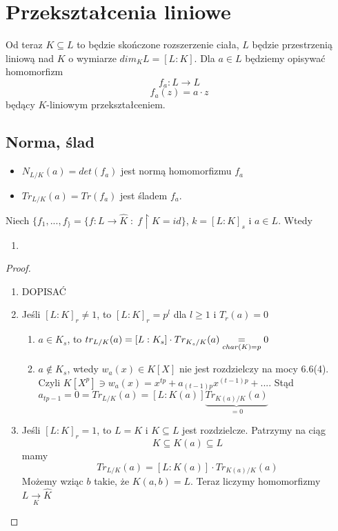 \section{Przekształcenia liniowe}

Od teraz $K\subseteq L$ to będzie skończone rozszerzenie ciała, $L$ będzie przestrzenią liniową nad $K$ o wymiarze $dim_KL=[L:K]$. Dla $a\in L$ będziemy opisywać homomorfizm
$$f_a:L\to L$$
$$f_a(z)=a\cdot z$$
będący $K$-liniowym przekształceniem.

\subsection{Norma, ślad}

\begin{bbox}
\begin{itemize}
    \item[\PHtunny] $N_{L/K}(a)=det(f_a)$ jest normą homomorfizmu $f_a$
    \item[\PHtunny] $Tr_{L/K}(a)=Tr(f_a)$ jest śladem $f_a$.
\end{itemize}
\end{bbox}

\begin{fact}
Niech $\{f_1,...,f_\}=\{f:L\to \hat{K}\;:\;f\restriction K=id\}$, $k=[L:K]_s$ i $a\in L$. Wtedy
\begin{enumerate}
    \item 
\end{enumerate}
\end{fact}
\begin{proof}
\begin{enumerate}[leftmargin=*]
    \item DOPISAĆ
    \item Jeśli $[L:K]_r\neq 1$, to $[L:K]_r=p^l$ dla $l\geq 1$ i $T_r(a)=0$
    \begin{enumerate}
        \item $a\in K_s$, to $tr_{L/K}(a)=[L:K_s]\cdot Tr_{K_s/K}(a)\underset{{\scriptsize char(K)=p}}{=}0$
        \item $a\notin K_s$, wtedy $w_a(x)\in K[X]$ nie jest rozdzielczy na mocy 6.6(4). Czyli $K[X^p]\ni w_a(x)=x^{tp}+a_{(t-1)p}x^{(t-1)p}+...$. Stąd $a_{tp-1}=0=Tr_{L/K}(a)=[L:K(a)]\underbrace{Tr_{K(a)/K}(a)}_{=0}$
    \end{enumerate}
    \item Jeśli $[L:K]_r=1$, to $L=K$ i $K\subseteq L$ jest rozdzielcze. Patrzymy na ciąg
    $$K\subseteq K(a)\subseteq L$$
    mamy
    $$Tr_{L/K}(a)=[L:K(a)]\cdot Tr_{K(a)/K}(a)$$
    Możemy wziąc $b$ takie, że $K(a,b)=L$. Teraz liczymy homomorfizmy $L\underset{K}{\to} \hat{K}$
\end{enumerate}
\end{proof}


